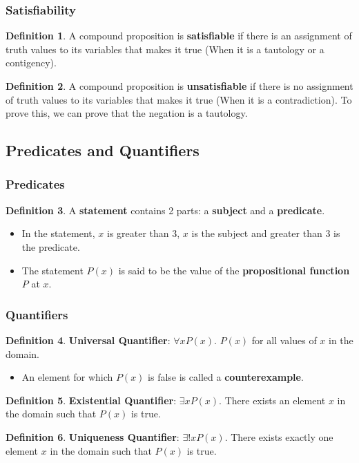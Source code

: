 \documentclass[article, 11pt]{article}
\theoremstyle{definition}
\newtheorem{definition}{Definition}[section]
\begin{document}
    \subsubsection{Satisfiability}
    \begin{definition}
        A compound proposition is \textbf{satisfiable} if there is an assignment of truth values to its variables that makes it true (When it is a tautology or a contigency). 
    \end{definition}
    \begin{definition}
        A compound proposition is \textbf{unsatisfiable} if there is no assignment of truth values to its variables that makes it true (When it is a contradiction). To prove this, we can prove that the negation is a tautology.
    \end{definition}
    \subsection{Predicates and Quantifiers}
    \subsubsection{Predicates}
    \begin{definition}
        A \textbf{statement} contains 2 parts: a \textbf{subject} and a \textbf{predicate}.
        \begin{itemize}
            \item In the statement, $x$ is greater than 3, $x$ is the subject and greater than 3 is the predicate.
            \item The statement $P(x)$ is said to be the value of the \textbf{propositional function} $P$ at $x$.
        \end{itemize}
    \end{definition}
    \subsubsection{Quantifiers}
    \begin{definition}
        \textbf{Universal Quantifier}: $\forall x P(x)$. $P(x)$ for all values of $x$ in the domain.
        \begin{itemize}
            \item An element for which $P(x)$ is false is called a \textbf{counterexample}.
        \end{itemize}   
    \end{definition}
    \begin{definition}
        \textbf{Existential Quantifier}: $\exists x P(x)$. There exists an element $x$ in the domain such that $P(x)$ is true.    
    \end{definition}
    \begin{definition}
        \textbf{Uniqueness Quantifier}: $\exists! x P(x)$. There exists exactly one element $x$ in the domain such that $P(x)$ is true.    
    \end{definition}
    
\end{document}

